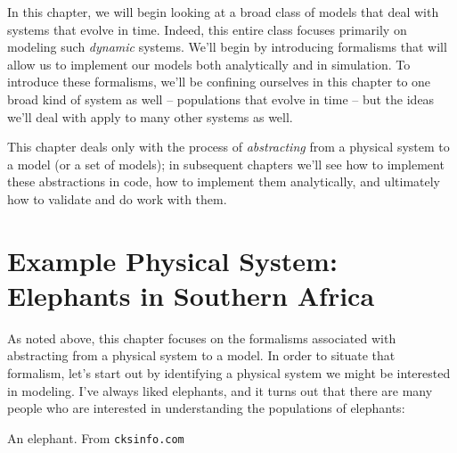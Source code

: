 In this chapter, we will begin looking at a broad class of models that deal with systems that evolve in time.  Indeed, this entire class focuses primarily on modeling such {\it dynamic} systems.   We'll begin by introducing formalisms that will allow us to implement our models both analytically and in simulation.  To introduce these formalisms, we'll be confining ourselves in this chapter to one broad kind of system as well -- populations that evolve in time -- but the ideas we'll deal with apply to many other systems as well.

This chapter deals only with the process of {\it abstracting} from a physical system to a model (or a set of models); in subsequent chapters we'll see how to implement these abstractions in code, how to implement them analytically, and ultimately how to validate and do work with them.  

\section{Example Physical System: Elephants in Southern Africa}

As noted above, this chapter focuses on the formalisms associated with abstracting from a physical system to a model.  In order to situate that formalism, let's start out by identifying a physical system we might be interested in modeling.  I've always liked elephants, and it turns out that there are many people who are interested in understanding the populations of elephants:

\begin{marginfigure}
\caption{An elephant.  From {\tt cksinfo.com}}
\end{marginfigure}

